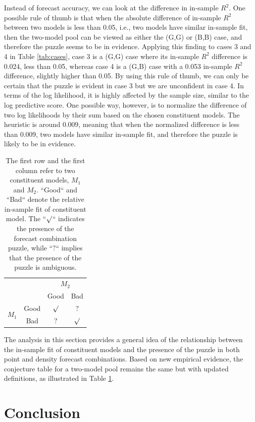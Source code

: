 \documentclass{monashthesis}
\begin{document}
Instead of forecast accuracy, we can look at the difference in in-sample \(R^2\). One possible rule of thumb is that when the absolute difference of in-sample \(R^2\) between two models is less than 0.05, i.e., two models have similar in-sample fit, then the two-model pool can be viewed as either the (G,G) or (B,B) case, and therefore the puzzle seems to be in evidence. Applying this finding to cases 3 and 4 in Table \ref{tab:cases}, case 3 is a (G,G) case where its in-sample \(R^2\) difference is 0.024, less than 0.05, whereas case 4 is a (G,B) case with a 0.053 in-sample \(R^2\) difference, slightly higher than 0.05. By using this rule of thumb, we can only be certain that the puzzle is evident in case 3 but we are unconfident in case 4. In terms of the log likelihood, it is highly affected by the sample size, similar to the log predictive score. One possible way, however, is to normalize the difference of two log likelihoods by their sum based on the chosen constituent models. The heuristic is around 0.009, meaning that when the normalized difference is less than 0.009, two models have similar in-sample fit, and therefore the puzzle is likely to be in evidence.

\begin{table}[ht]
\centering
\begin{tabular}{cccc}
                       &      & \multicolumn{2}{c}{$M_2$} \\
                       &      & Good       & Bad       \\
\multirow{2}{*}{$M_1$} & Good & $\surd$    & $?$ \\
                       & Bad  & $?$        & $\surd$
\end{tabular}
\caption{The first row and the first column refer to two constituent models, $M_1$ and $M_2$. ``Good`` and ``Bad`` denote the relative in-sample fit of constituent model. The ``$\surd$`` indicates the presence of the forecast combination puzzle, while ``$?$`` implies that the presence of the puzzle is ambiguous.}
\label{tab:2}
\end{table}

The analysis in this section provides a general idea of the relationship between the in-sample fit of constituent models and the presence of the puzzle in both point and density forecast combinations. Based on new empirical evidence, the conjecture table for a two-model pool remains the same but with updated definitions, as illustrated in Table \ref{tab:2}.

\hypertarget{conclusion}{%
\chapter{Conclusion}\label{conclusion}}
\end{document}
